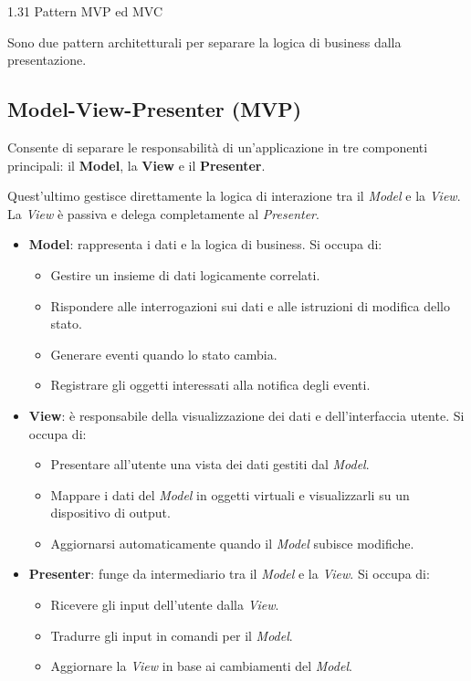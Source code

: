 \begin{problem}{1.31}
Pattern MVP ed MVC
\end{problem}
\begin{solution}
Sono due pattern architetturali per separare la logica di business dalla presentazione. 

\subsection*{Model-View-Presenter (MVP)}
Consente di separare le responsabilità di un'applicazione in tre componenti principali: il \textbf{Model}, la \textbf{View} 
e il \textbf{Presenter}. 

Quest'ultimo gestisce direttamente la logica di interazione tra il \textit{Model} e la \textit{View}. 
La \textit{View} è passiva e delega completamente al \textit{Presenter}.

\begin{itemize}
	\item \textbf{Model}: rappresenta i dati e la logica di business. Si occupa di:
	\begin{itemize}
		\item Gestire un insieme di dati logicamente correlati.
		\item Rispondere alle interrogazioni sui dati e alle istruzioni di modifica dello stato.
		\item Generare eventi quando lo stato cambia.
		\item Registrare gli oggetti interessati alla notifica degli eventi.
	\end{itemize}
	\item \textbf{View}: è responsabile della visualizzazione dei dati e dell'interfaccia utente. Si occupa di:
	\begin{itemize}
		\item Presentare all'utente una vista dei dati gestiti dal \textit{Model}.
		\item Mappare i dati del \textit{Model} in oggetti virtuali e visualizzarli su un dispositivo di output.
		\item Aggiornarsi automaticamente quando il \textit{Model} subisce modifiche.
	\end{itemize}
	\item \textbf{Presenter}: funge da intermediario tra il \textit{Model} e la \textit{View}. Si occupa di:
	\begin{itemize}
		\item Ricevere gli input dell'utente dalla \textit{View}.
		\item Tradurre gli input in comandi per il \textit{Model}.
		\item Aggiornare la \textit{View} in base ai cambiamenti del \textit{Model}.
	\end{itemize}
\end{itemize}


\end{solution}
